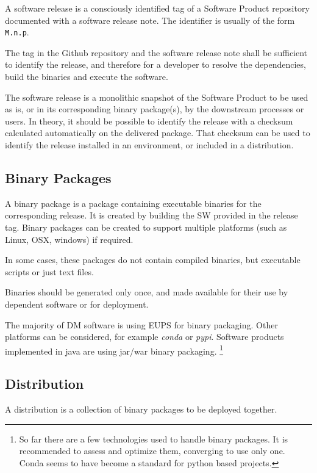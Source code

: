 A software release is a consciously identified tag of a Software Product repository documented with a software release note.
The identifier is usually of the form \texttt{M.n.p}.

The tag in the Github repository and the software release note shall be sufficient to identify the release, and therefore for a developer
to resolve the dependencies, build the binaries and execute the software.

The software release is a monolithic snapshot of the Software Product to be used as is, or in its corresponding binary package(s), by the downstream processes or users.
In theory, it should be possible to identify the release with a checksum calculated automatically on the delivered package.
That checksum can be used to identify the release installed in an environment, or included in a distribution.


\subsection{Binary Packages} \label{sec:swbpkg}

A binary package is a package containing executable binaries for the corresponding release.
It is created by building the SW provided in the release tag.
Binary packages can be created to support multiple platforms (such as Linux, OSX, windows) if required.

In some cases, these packages do not contain compiled binaries, but executable scripts or just text files.

Binaries should be generated only once, and made available for their use by dependent software or for deployment.

The majority of DM software is using EUPS for binary packaging. Other platforms can be considered, for example \textit{conda} or \textit{pypi}.
Software products implemented in java are using jar/war binary packaging.
\footnote{So far there are a few technologies used to handle binary packages. It is recommended to assess and optimize them, converging to use only one.
Conda seems to have become a standard for python based projects.}

\subsection{Distribution} \label{sec:distribution}

A distribution is a collection of binary packages to be deployed together.

